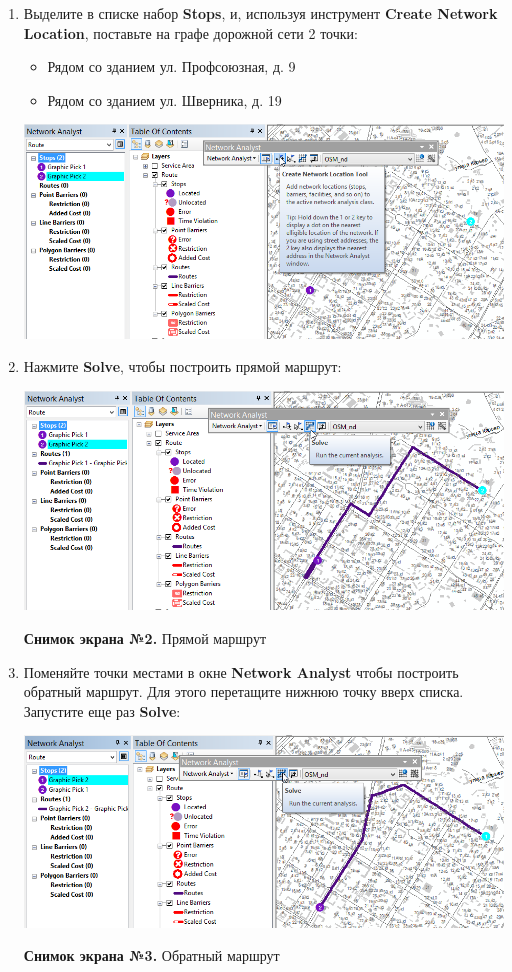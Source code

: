 \documentclass[]{book}
\providecommand{\tightlist}{%
  \setlength{\itemsep}{0pt}\setlength{\parskip}{0pt}}
\theoremstyle{definition}
\theoremstyle{definition}
\theoremstyle{definition}
\theoremstyle{remark}
\begin{document}
\begin{enumerate}
\def\labelenumi{\arabic{enumi}.}
\item
  Выделите в списке набор \textbf{Stops}, и, используя инструмент
  \textbf{Create Network Location}, поставьте на графе дорожной сети 2
  точки:

  \begin{itemize}
  \tightlist
  \item
    Рядом со зданием ул. Профсоюзная, д. 9
  \item
    Рядом со зданием ул. Шверника, д. 19
  \end{itemize}

  \includegraphics{images/Ex12/image10.png}
\item
  Нажмите \textbf{Solve}, чтобы построить прямой маршрут:

  \includegraphics{images/Ex12/image11.png}

  \textbf{Снимок экрана №2.} Прямой маршрут
\item
  Поменяйте точки местами в окне \textbf{Network Analyst} чтобы
  построить обратный маршрут. Для этого перетащите нижнюю точку вверх
  списка. Запустите еще раз \textbf{Solve}:

  \includegraphics{images/Ex12/image12.png}

   \textbf{Снимок экрана №3.} Обратный маршрут
\end{enumerate}
\end{document}
